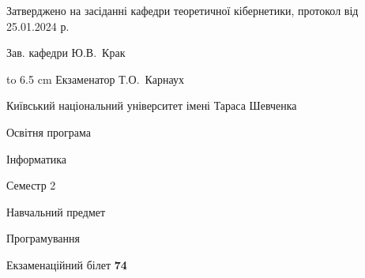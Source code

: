 \documentclass[12pt, ukrainian]{article}
\begin{document}
{\smallskip\smallskip \begin {scriptsize} Затверджено на засіданні кафедри теоретичної кібернетики, протокол   від   25.01.2024 р.\par\smallskip\smallskip\smallskip\smallskip
{\parbox {6.5 cm} {Зав. кафедри \dotfill Ю.В.~Крак}}\hspace {0.7cm} {\hbox to 6.5 cm { Екзаменатор \dotfill Т.О.~Карнаух}} \end{scriptsize}}
\newpage
{{\begin {scriptsize}\par
{ \center  Київський національний університет імені Тараса Шевченка \par}
{\parbox {5 cm}{Освітня програма \hfill}{\parbox {7 cm}{Інформатика\hfill}}\parbox {6 cm}{\hfill Семестр 2}}\par
{\parbox {5 cm} {Навчальний предмет \hfill}\parbox {7 cm}{Програмування \hfill}\parbox {6cm}{\hfill}\par}\vspace{-15pt} \end{scriptsize}}{\center Екзаменаційний білет \No \textbf { 74 }\par}}
\end{document}
